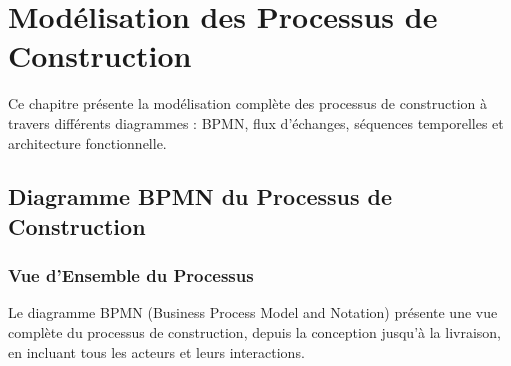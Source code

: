 
\chapter{Modélisation des Processus de Construction}

\begin{objectivebox}
Ce chapitre présente la modélisation complète des processus de construction à travers différents diagrammes : BPMN, flux d'échanges, séquences temporelles et architecture fonctionnelle.
\end{objectivebox}


\section{Diagramme BPMN du Processus de Construction}

\subsection{Vue d'Ensemble du Processus}

Le diagramme BPMN (Business Process Model and Notation) présente une vue complète du processus de construction, depuis la conception jusqu'à la livraison, en incluant tous les acteurs et leurs interactions.

